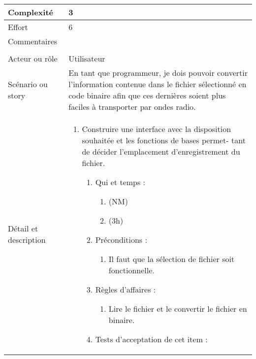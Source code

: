 \begin{longtable}{|l|p{}|}
\hline
    Complexité & 3 \\
\hline
    Effort & 6 \\
\hline
    Commentaires &  \\

\hline
    \rowcolor{Gray}
    \multicolumn{2}{|l|}{4} \\
\hline
    Acteur ou rôle & Utilisateur \\
\hline
    Scénario ou story & En tant que programmeur, je dois pouvoir convertir l’information contenue dans le fichier sélectionné en code binaire afin que ces dernières soient plus faciles à transporter par ondes radio. \\
\hline
    Détail et description &
        \begin{enumerate}[label*=\arabic*.]
            \item Construire une interface avec la disposition souhaitée et les fonctions de bases permet- tant de décider l’emplacement d’enregistrement du fichier.
                \begin{enumerate}[label*=\arabic*.]
                                \item Qui et temps :
                                \begin{enumerate}[label*=\arabic*.]
                                    \item (NM)
                                    \item (3h)
                                \end{enumerate}
                                \item Préconditions :
                                \begin{enumerate}[label*=\arabic*.]
                                    \item Il faut que la sélection de fichier soit fonctionnelle.
                                \end{enumerate}
                                \item Règles d'affaires :
                                \begin{enumerate}[label*=\arabic*.]
                                    \item Lire le fichier et le convertir le fichier en binaire. 
                                \end{enumerate}
                                \item Tests d'acceptation de cet item :
                                \begin{enumerate}[label*=\arabic*.]

\end{enumerate}
\end{enumerate}
\end{enumerate}
\end{longtable}
